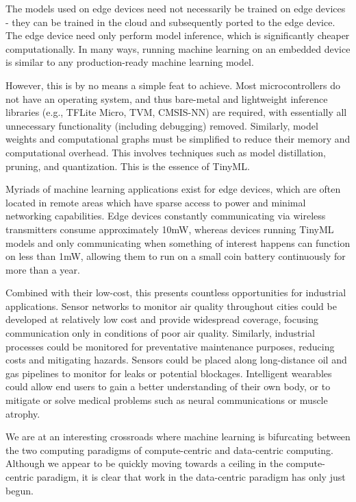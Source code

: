 The models used on edge devices need not necessarily be trained on edge devices - they can be trained in the cloud and subsequently ported to the edge device. The edge device need only perform model inference, which is significantly cheaper computationally. In many ways, running machine learning on an embedded device is similar to any production-ready machine learning model.

However, this is by no means a simple feat to achieve. Most microcontrollers do not have an operating system, and thus bare-metal and lightweight inference libraries (e.g., TFLite Micro, TVM, CMSIS-NN) are required, with essentially all unnecessary functionality (including debugging) removed. Similarly, model weights and computational graphs must be simplified to reduce their memory and computational overhead. This involves techniques such as model distillation, pruning, and quantization. This is the essence of TinyML.

Myriads of machine learning applications exist for edge devices, which are often located in remote areas which have sparse access to power and minimal networking capabilities. Edge devices constantly communicating via wireless transmitters consume approximately 10mW, whereas devices running TinyML models and only communicating when something of interest happens can function on less than 1mW, allowing them to run on a small coin battery continuously for more than a year. 

Combined with their low-cost, this presents countless opportunities for industrial applications. Sensor networks to monitor air quality throughout cities could be developed at relatively low cost and provide widespread coverage, focusing communication only in conditions of poor air quality. Similarly, industrial processes could be monitored for preventative maintenance purposes, reducing costs and mitigating hazards. Sensors could be placed along long-distance oil and gas pipelines to monitor for leaks or potential blockages. Intelligent wearables could allow end users to gain a better understanding of their own body, or to mitigate or solve medical problems such as neural communications or muscle atrophy.

We are at an interesting crossroads where machine learning is bifurcating between the two computing paradigms of compute-centric and data-centric computing. Although we appear to be quickly moving towards a ceiling in the compute-centric paradigm, it is clear that work in the data-centric paradigm has only just begun. 



